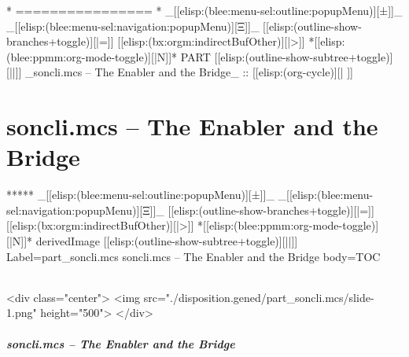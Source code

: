 \begin{whenOrg}
\begin{whenOrg}
*      ================
*  _[[elisp:(blee:menu-sel:outline:popupMenu)][±]]_ _[[elisp:(blee:menu-sel:navigation:popupMenu)][Ξ]]_ [[elisp:(outline-show-branches+toggle)][|=]] [[elisp:(bx:orgm:indirectBufOther)][|>]] *[[elisp:(blee:ppmm:org-mode-toggle)][|N]]*  PART       [[elisp:(outline-show-subtree+toggle)][||]]   _soncli.mcs -- The Enabler and the Bridge_ ::  [[elisp:(org-cycle)][| ]]
\end{whenOrg}

\newpage
\part{soncli.mcs -- The Enabler and the Bridge}



\begin{whenOrg}
*****  _[[elisp:(blee:menu-sel:outline:popupMenu)][±]]_ _[[elisp:(blee:menu-sel:navigation:popupMenu)][Ξ]]_ [[elisp:(outline-show-branches+toggle)][|=]] [[elisp:(bx:orgm:indirectBufOther)][|>]] *[[elisp:(blee:ppmm:org-mode-toggle)][|N]]*  derivedImage [[elisp:(outline-show-subtree+toggle)][||]] Label=part_soncli.mcs soncli.mcs -- The Enabler and the Bridge body=TOC
\end{whenOrg}

\begin{htmlonly}

\begin{frame}[fragile,plain,label=part_soncli.mcs]
    \frametitle{}
    \framesubtitle{}
    \begin{rawhtml}
<div class="center">
<img src="./disposition.gened/part_soncli.mcs/slide-1.png" height="500">
</div>
    \end{rawhtml}
\end{frame}
\end{htmlonly}

\begin{verblatex}

\begin{frame}[fragile,label=part_soncli.mcs]
    \frametitle{soncli.mcs -- The Enabler and the Bridge}
    \framesubtitle{}


\end{frame}
\end{verblatex}
\end{whenOrg}
